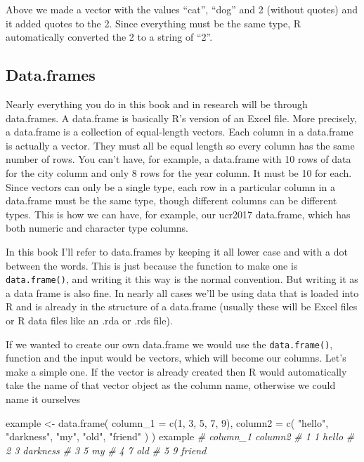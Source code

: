 \documentclass[
  a4paper,
]{krantz}
\makeatletter
\newenvironment{Shaded}{\begin{snugshade}}{\end{snugshade}}
\newcommand{\AttributeTok}[1]{\textcolor[rgb]{0.61,0.61,0.61}{#1}}
\newcommand{\CommentTok}[1]{\textcolor[rgb]{0.37,0.37,0.37}{\textit{#1}}}
\newcommand{\DecValTok}[1]{\textcolor[rgb]{0.06,0.06,0.06}{#1}}
\newcommand{\FunctionTok}[1]{\textcolor[rgb]{0,0,0}{#1}}
\newcommand{\NormalTok}[1]{#1}
\newcommand{\OtherTok}[1]{\textcolor[rgb]{0.37,0.37,0.37}{#1}}
\newcommand{\StringTok}[1]{\textcolor[rgb]{0.5,0.5,0.5}{#1}}
\newenvironment{kframe}{%
\medskip{}
\setlength{\fboxsep}{.8em}
 \def\at@end@of@kframe{}%
 \ifinner\ifhmode%
  \def\at@end@of@kframe{\end{minipage}}%
  \begin{minipage}{\columnwidth}%
 \fi\fi%
 \def\FrameCommand##1{\hskip\@totalleftmargin \hskip-\fboxsep
 \colorbox{shadecolor}{##1}\hskip-\fboxsep
     \hskip-\linewidth \hskip-\@totalleftmargin \hskip\columnwidth}%
 \MakeFramed {\advance\hsize-\width
   \@totalleftmargin\z@ \linewidth\hsize
   \@setminipage}}%
 {\par\unskip\endMakeFramed%
 \at@end@of@kframe}
\renewenvironment{Shaded}{\begin{kframe}}{\end{kframe}}
\makeatother
\begin{document}
Above we made a vector with the values ``cat'', ``dog'' and
2 (without quotes) and it added quotes to the 2. Since
everything must be the same type, R automatically converted
the 2 to a string of ``2''.

\hypertarget{dataframes}{%
\subsection{Data.frames}\label{dataframes}}

Nearly everything you do in this book and in research will
be through data.frames. A data.frame is basically R's
version of an Excel file. More precisely, a data.frame is a
collection of equal-length vectors. Each column in a
data.frame is actually a vector. They must all be equal
length so every column has the same number of rows. You
can't have, for example, a data.frame with 10 rows of data
for the city column and only 8 rows for the year column. It
must be 10 for each. Since vectors can only be a single
type, each row in a particular column in a data.frame must
be the same type, though different columns can be different
types. This is how we can have, for example, our ucr2017
data.frame, which has both numeric and character type
columns.

In this book I'll refer to data.frames by keeping it all
lower case and with a dot between the words. This is just
because the function to make one is \texttt{data.frame()},
and writing it this way is the normal convention. But
writing it as a data frame is also fine. In nearly all cases
we'll be using data that is loaded into R and is already in
the structure of a data.frame (usually these will be Excel
files or R data files like an .rda or .rds file).

If we wanted to create our own data.frame we would use the
\texttt{data.frame()}, function and the input would be
vectors, which will become our columns. Let's make a simple
one. If the vector is already created then R would
automatically take the name of that vector object as the
column name, otherwise we could name it ourselves

\begin{Shaded}
\begin{Highlighting}[]
\NormalTok{example }\OtherTok{\textless{}{-}} \FunctionTok{data.frame}\NormalTok{(}
  \AttributeTok{column\_1 =} \FunctionTok{c}\NormalTok{(}\DecValTok{1}\NormalTok{, }\DecValTok{3}\NormalTok{, }\DecValTok{5}\NormalTok{, }\DecValTok{7}\NormalTok{, }\DecValTok{9}\NormalTok{),}
  \AttributeTok{column2 =} \FunctionTok{c}\NormalTok{(}
    \StringTok{"hello"}\NormalTok{,}
    \StringTok{"darkness"}\NormalTok{,}
    \StringTok{"my"}\NormalTok{,}
    \StringTok{"old"}\NormalTok{,}
    \StringTok{"friend"}
\NormalTok{  )}
\NormalTok{)}
\NormalTok{example}
\CommentTok{\#   column\_1  column2}
\CommentTok{\# 1        1    hello}
\CommentTok{\# 2        3 darkness}
\CommentTok{\# 3        5       my}
\CommentTok{\# 4        7      old}
\CommentTok{\# 5        9   friend}
\end{Highlighting}
\end{Shaded}
\end{document}
